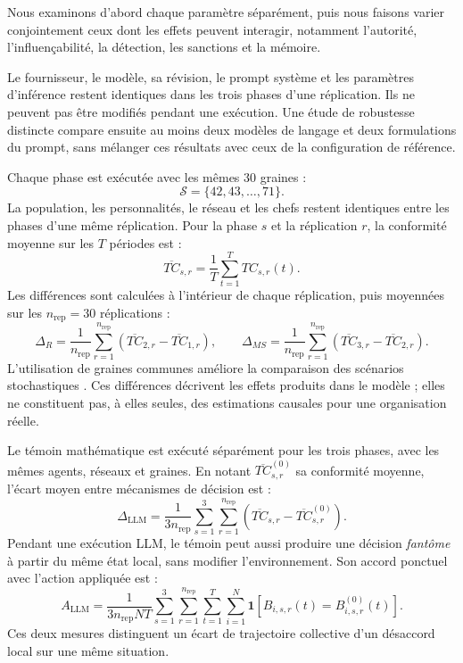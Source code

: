 \documentclass[10pt,a4paper]{article}
\begin{document}
Nous examinons d’abord chaque paramètre séparément, puis nous faisons varier
conjointement ceux dont les effets peuvent interagir, notamment l’autorité,
l’influençabilité, la détection, les sanctions et la mémoire.

Le fournisseur, le modèle, sa révision, le prompt système et les paramètres
d’inférence restent identiques dans les trois phases d’une réplication. Ils ne
peuvent pas être modifiés pendant une exécution. Une étude de robustesse
distincte compare ensuite au moins deux modèles de langage et deux formulations
du prompt, sans mélanger ces résultats avec ceux de la configuration de
référence.

Chaque phase est exécutée avec les mêmes 30 graines :
\[
\mathcal S=\{42,43,\ldots,71\}.
\]
La population, les personnalités, le réseau et les chefs restent identiques
entre les phases d’une même réplication. Pour la phase $s$ et la réplication
$r$, la conformité moyenne sur les $T$ périodes est :
\[
\overline{TC}_{s,r}=\frac{1}{T}\sum_{t=1}^{T}TC_{s,r}(t).
\]
Les différences sont calculées à l’intérieur de chaque réplication, puis
moyennées sur les $n_{\mathrm{rep}}=30$ réplications :
\[
\Delta_R=\frac{1}{n_{\mathrm{rep}}}\sum_{r=1}^{n_{\mathrm{rep}}}
(\overline{TC}_{2,r}-\overline{TC}_{1,r}),\qquad
\Delta_{MS}=\frac{1}{n_{\mathrm{rep}}}\sum_{r=1}^{n_{\mathrm{rep}}}
(\overline{TC}_{3,r}-\overline{TC}_{2,r}).
\]
L’utilisation de graines communes améliore la comparaison des scénarios
stochastiques \cite{schruben2011}.
Ces différences décrivent les effets produits dans le modèle ; elles ne
constituent pas, à elles seules, des estimations causales pour une organisation
réelle.

Le témoin mathématique est exécuté séparément pour les trois phases, avec les
mêmes agents, réseaux et graines. En notant
$\overline{TC}^{(0)}_{s,r}$ sa conformité moyenne, l’écart moyen entre
mécanismes de décision est :
\[
\Delta_{\mathrm{LLM}}=
\frac{1}{3n_{\mathrm{rep}}}
\sum_{s=1}^{3}\sum_{r=1}^{n_{\mathrm{rep}}}
\left(\overline{TC}_{s,r}-\overline{TC}^{(0)}_{s,r}\right).
\]
Pendant une exécution LLM, le témoin peut aussi produire une décision
\emph{fantôme} à partir du même état local, sans modifier l’environnement. Son
accord ponctuel avec l’action appliquée est :
\[
A_{\mathrm{LLM}}=
\frac{1}{3n_{\mathrm{rep}}NT}
\sum_{s=1}^{3}\sum_{r=1}^{n_{\mathrm{rep}}}
\sum_{t=1}^{T}\sum_{i=1}^{N}
\mathbf 1\!\left[B_{i,s,r}(t)=B_{i,s,r}^{(0)}(t)\right].
\]
Ces deux mesures distinguent un écart de trajectoire collective d’un désaccord
local sur une même situation.
\end{document}
